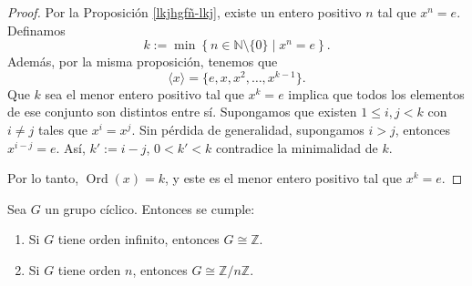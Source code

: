 \begin{proof}
	Por la Proposición \ref{lkjhgfñ-lkj}, existe un entero positivo \( n \) tal que \( x^n = e \). Definamos
	\[
	k := \min \left\{ n \in \mathbb{N} \setminus \{0\} \mid x^n = e \right\}.
	\]
	Además, por la misma proposición, tenemos que
	\[
	\langle x \rangle = \{ e, x, x^2, \dots, x^{k-1} \}.
	\]
	Que \( k \) sea el menor entero positivo tal que \( x^k = e \) implica que todos los elementos de ese conjunto son distintos entre sí. Supongamos que existen \( 1 \leq i, j < k \) con \( i \neq j \) tales que \( x^i = x^j \). Sin pérdida de generalidad, supongamos \( i > j \), entonces \( x^{i - j} = e \). Así,  $k':=i-j$, \( 0 < k '< k \) contradice la minimalidad de \( k \). 
	
	\medskip
	\noindent Por lo tanto, \( \operatorname{Ord}(x) = k \), y este es el menor entero positivo tal que \( x^k = e \).
\end{proof}

\begin{definicion}
\end{definicion}

\begin{proposicion}\label{lkjhghjklñ}
	\upshape
	Sea \( G \) un grupo cíclico. Entonces se cumple:
	\begin{enumerate}
		\item Si \( G \) tiene orden infinito, entonces \( G \cong \mathbb{Z} \).
		\item Si \( G \) tiene orden \( n \), entonces \( G \cong \mathbb{Z}/n\mathbb{Z} \).
	\end{enumerate}
\end{proposicion}

